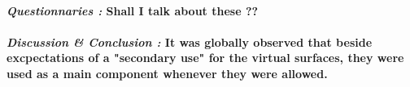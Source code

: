 \documentclass{article}
\begin{document}
    \paragraph{ \textit{Questionnaries :}
                \newline
                \indent \indent \textnormal{Shall I talk about these ??}}
    
    \paragraph{ \textit{Discussion \& Conclusion :} 
                \newline
                \indent \indent \textnormal{It was globally observed that beside excpectations of a "secondary use" for the virtual surfaces, they were used as a main component whenever they were 
                allowed. }}
\end{document}
